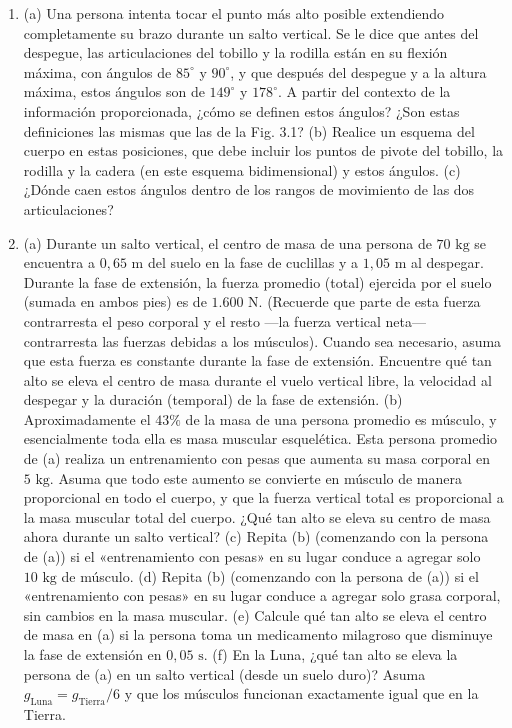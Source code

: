 \documentclass[12pt]{book}
\begin{document}
\begin{enumerate}
\item[3.46] (a) Una persona intenta tocar el punto más alto posible extendiendo completamente su brazo durante un salto vertical. Se le dice que antes del despegue, las articulaciones del tobillo y la rodilla están en su flexión máxima, con ángulos de $85^\circ$ y $90^\circ$, y que después del despegue y a la altura máxima, estos ángulos son de $149^\circ$ y $178^\circ$. A partir del contexto de la información proporcionada, ¿cómo se definen estos ángulos? ¿Son estas definiciones las mismas que las de la Fig. 3.1?
(b) Realice un esquema del cuerpo en estas posiciones, que debe incluir los puntos de pivote del tobillo, la rodilla y la cadera (en este esquema bidimensional) y estos ángulos.
(c) ¿Dónde caen estos ángulos dentro de los rangos de movimiento de las dos articulaciones?

\item[3.47] (a) Durante un salto vertical, el centro de masa de una persona de $70\text{ kg}$ se encuentra a $0{,}65\text{ m}$ del suelo en la fase de cuclillas y a $1{,}05\text{ m}$ al despegar. Durante la fase de extensión, la fuerza promedio (total) ejercida por el suelo (sumada en ambos pies) es de $1.600\text{ N}$. (Recuerde que parte de esta fuerza contrarresta el peso corporal y el resto ---la fuerza vertical neta--- contrarresta las fuerzas debidas a los músculos). Cuando sea necesario, asuma que esta fuerza es constante durante la fase de extensión. Encuentre qué tan alto se eleva el centro de masa durante el vuelo vertical libre, la velocidad al despegar y la duración (temporal) de la fase de extensión.
(b) Aproximadamente el $43\%$ de la masa de una persona promedio es músculo, y esencialmente toda ella es masa muscular esquelética. Esta persona promedio de (a) realiza un entrenamiento con pesas que aumenta su masa corporal en $5\text{ kg}$. Asuma que todo este aumento se convierte en músculo de manera proporcional en todo el cuerpo, y que la fuerza vertical total es proporcional a la masa muscular total del cuerpo. ¿Qué tan alto se eleva su centro de masa ahora durante un salto vertical?
(c) Repita (b) (comenzando con la persona de (a)) si el «entrenamiento con pesas» en su lugar conduce a agregar solo $10\text{ kg}$ de músculo.
(d) Repita (b) (comenzando con la persona de (a)) si el «entrenamiento con pesas» en su lugar conduce a agregar solo grasa corporal, sin cambios en la masa muscular.
(e) Calcule qué tan alto se eleva el centro de masa en (a) si la persona toma un medicamento milagroso que disminuye la fase de extensión en $0{,}05\text{ s}$.
(f) En la Luna, ¿qué tan alto se eleva la persona de (a) en un salto vertical (desde un suelo duro)? Asuma $g_{\text{Luna}} = g_{\text{Tierra}}/6$ y que los músculos funcionan exactamente igual que en la Tierra.


\end{enumerate}
\end{document}
